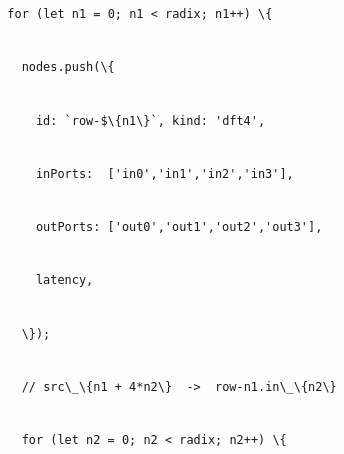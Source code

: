 \documentclass[
]{article}
\newcommand{\passthrough}[1]{#1}
\begin{document}
\passthrough{\lstinline!  !}\passthrough{\lstinline!for!}\passthrough{\lstinline! !}\passthrough{\lstinline!(let!}\passthrough{\lstinline! !}\passthrough{\lstinline!n1!}\passthrough{\lstinline! !}\passthrough{\lstinline!=!}\passthrough{\lstinline! !}\passthrough{\lstinline!0;!}\passthrough{\lstinline! !}\passthrough{\lstinline!n1!}\passthrough{\lstinline! !}\passthrough{\lstinline!<!}\passthrough{\lstinline! !}\passthrough{\lstinline!radix;!}\passthrough{\lstinline! !}\passthrough{\lstinline!n1++)!}\passthrough{\lstinline! !}\passthrough{\lstinline!\{!}\strut \\
\passthrough{\lstinline!    !}\passthrough{\lstinline!nodes.push!}\passthrough{\lstinline!(\{!}\strut \\
\passthrough{\lstinline!      !}\passthrough{\lstinline!id:!}\passthrough{\lstinline! !}\passthrough{\lstinline!`row-$\{n1\}`,!}\passthrough{\lstinline! !}\passthrough{\lstinline!kind:!}\passthrough{\lstinline! !}\passthrough{\lstinline!'dft4',!}\strut \\
\passthrough{\lstinline!      !}\passthrough{\lstinline!inPorts!}\passthrough{\lstinline!:!}\passthrough{\lstinline!  !}\passthrough{\lstinline!['in0','in1','in2','in3'],!}\strut \\
\passthrough{\lstinline!      !}\passthrough{\lstinline!outPorts!}\passthrough{\lstinline!:!}\passthrough{\lstinline! !}\passthrough{\lstinline!['out0','out1','out2','out3'],!}\strut \\
\passthrough{\lstinline!      !}\passthrough{\lstinline!latency,!}\strut \\
\passthrough{\lstinline!    !}\passthrough{\lstinline!\});!}\strut \\
\passthrough{\lstinline!    !}\passthrough{\lstinline!//!}\passthrough{\lstinline! !}\passthrough{\lstinline!src!}\passthrough{\lstinline!\_\{n1!}\passthrough{\lstinline! !}\passthrough{\lstinline!+!}\passthrough{\lstinline! !}\passthrough{\lstinline!4*n2\}!}\passthrough{\lstinline!  !}\passthrough{\lstinline!->!}\passthrough{\lstinline!  !}\passthrough{\lstinline!row-n1.in\_\{n2\}!}\strut \\
\passthrough{\lstinline!    !}\passthrough{\lstinline!for!}\passthrough{\lstinline! !}\passthrough{\lstinline!(let!}\passthrough{\lstinline! !}\passthrough{\lstinline!n2!}\passthrough{\lstinline! !}\passthrough{\lstinline!=!}\passthrough{\lstinline! !}\passthrough{\lstinline!0;!}\passthrough{\lstinline! !}\passthrough{\lstinline!n2!}\passthrough{\lstinline! !}\passthrough{\lstinline!<!}\passthrough{\lstinline! !}\passthrough{\lstinline!radix;!}\passthrough{\lstinline! !}\passthrough{\lstinline!n2++)!}\passthrough{\lstinline! !}\passthrough{\lstinline!\{!}\strut \\
\end{document}
